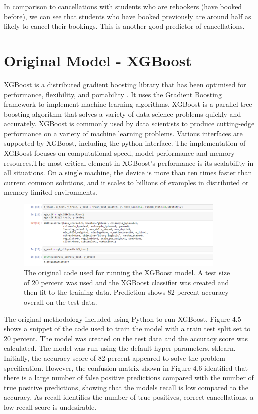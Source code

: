 In comparison to cancellations with students who are rebookers (have booked before), we can see that students who have booked previously are around half as likely to cancel their bookings. This is another good predictor of cancellations.  
 
 \section{Original Model - XGBoost}

XGBoost is a distributed gradient boosting library that has been optimised for performance, flexibility, and portability \cite{Chen2016XGBoost:System}. It uses the Gradient Boosting framework to implement machine learning algorithms. XGBoost is a parallel tree boosting algorithm that solves a variety of data science problems quickly and accurately. XGBoost is commonly used by data scientists to produce cutting-edge performance on a variety of machine learning problems. Various interfaces are supported by XGBoost, including the python interface. The implementation of XGBoost focuses on computational speed, model performance and memory resources.The most critical element in XGBoost's performance is its scalability in all situations. On a single machine, the device is more than ten times faster than current common solutions, and it scales to billions of examples in distributed or memory-limited environments\cite{ChenXGBoost:System}.

 \begin{figure}[H]
 \centering
\includegraphics[width=10cm]{figures/xg_boost_code.png}
 \caption{The original code used for running the XGBoost model. A test size of 20 percent was used and the XGBoost classifier was created and then fit to the training data. Prediction shows 82 percent accuracy overall on the test data.}
\end{figure}

The original methodology included using Python to run XGBoost, Figure 4.5 shows a snippet of the code used to train the model with a train test split set to 20 percent. The model was created on the test data and the accuracy score was calculated. The model was run using the default hyper parameters, sklearn. Initially, the accuracy score of 82 percent appeared to solve the problem specification. However, the confusion matrix shown in Figure 4.6 identified that there is a large number of false positive predictions compared with the number of true positive predictions, showing that the models recall is low compared to the accuracy. As recall identifies the number of true positives, correct cancellations, a low recall score is undesirable.

